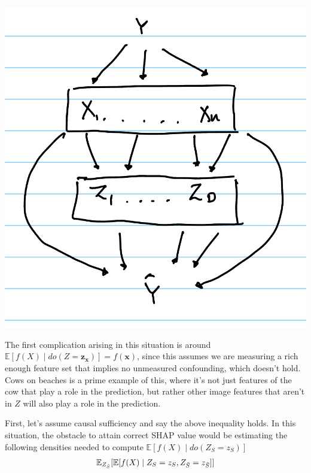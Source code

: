 \documentclass{article}
\begin{document}
\begin{center}
\includegraphics[scale=0.2]{Z_after_X.jpeg}
\end{center}

The first complication arising in this situation is around $\mathbb{E}[f(X) \mid do(Z = \mathbf{z}_{\mathbf{x}})] = f(\mathbf{x})$, since this assumes we are measuring a rich enough feature set that implies no unmeasured confounding, which doesn't hold. Cows on beaches is a prime example of this, where it's not just features of the cow that play a role in the prediction, but rather other image features that aren't in $Z$ will also play a role in the prediction.

First, let's assume causal sufficiency and say the above inequality holds. In this situation, the obstacle to attain correct SHAP value would be estimating the following densities needed to compute $\mathbb{E}[f(X) \mid do(Z_S = z_S) ]$
\begin{align*}
\mathbb{E}_{Z_{\Bar{S}}}[\mathbb{E}[f(X) \mid Z_S = z_S, Z_{\Bar{S}} = z_{\Bar{S}}]]
\end{align*}
\end{document}

